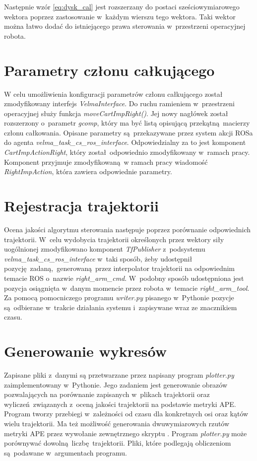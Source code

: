 Następnie wzór \ref{eq:dysk_cal} jest rozszerzany do postaci sześciowymiarowego wektora poprzez zastosowanie w~każdym wierszu tego wektora. Taki wektor można łatwo dodać do istniejącego prawa sterowania w~przestrzeni operacyjnej robota.

\section{Parametry członu całkującego}
W celu umożliwienia konfiguracji parametrów członu całkującego został zmodyfikowany interfejs \textit{VelmaInterface}. Do ruchu ramieniem w~przestrzeni operacyjnej służy funkcja \textit{moveCartImpRight()}. Jej nowy nagłówek został rozszerzony o~parametr \textit{gcomp}, który ma być listą opisującą przekątną macierzy członu całkowania. Opisane parametry są przekazywane przez system akcji ROSa do agenta \textit{velma\_task\_cs\_ros\_interface}. Odpowiedzialny za to jest komponent \textit{CartImpActionRight}, który został odpowiednio zmodyfikowany w~ramach pracy. Komponent przyjmuje zmodyfikowaną w ramach pracy wiadomość \textit{RightImpAction}, która zawiera odpowiednie parametry. 
 
\section{Rejestracja trajektorii}
Ocena jakości algorytmu sterowania następuje poprzez porównanie odpowiednich trajektorii. W~celu wydobycia trajektorii określonych przez wektory siły uogólnionej zmodyfikowano komponent \textit{TfPublisher} z~podsystemu \textit{velma\_task\_cs\_ros\_interface} w~taki sposób, żeby udostępnił pozycję zadaną, generowaną przez interpolator trajektorii na odpowiednim temacie ROS o~nazwie \textit{right\_arm\_cmd}. W~podobny sposób udostępniona jest pozycja osiągnięta w~danym momencie przez robota w~temacie \textit{right\_arm\_tool}. Za pomocą pomocniczego programu \textit{writer.py} pisanego w~Pythonie pozycje są odbierane w~trakcie działania systemu i~zapisywane wraz ze znacznikiem czasu.


\section{Generowanie wykresów}
Zapisane pliki z~danymi są przetwarzane przez napisany program \textit{plotter.py} zaimplementowany w~Pythonie. Jego zadaniem jest generowanie obrazów pozwalających na porównanie zapisanych w~plikach trajektorii oraz wyliczeń związanych z~oceną jakości trajektorii na podstawie metryki APE. Program tworzy przebiegi w~zależności od czasu dla konkretnych osi oraz kątów wielu trajektorii. Ma też możliwość generowania dwuwymiarowych rzutów metryki APE przez wywołanie zewnętrznego skryptu \cite{bib:evaluate_ape}. Program \textit{plotter.py} może porównywać dowolną liczbę trajektorii. Pliki, które podlegają obliczeniom są podawane w~argumentach programu.


